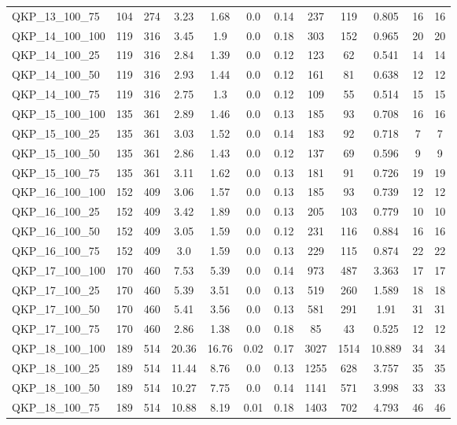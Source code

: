 \begin{table}[!h]
{\begin{tabular}{lccccccccccc}
QKP\_13\_100\_75 & 104 & 274 & 3.23 & 1.68 & 0.0 & 0.14 & 237 & 119 & 0.805 & 16 & 16\\
QKP\_14\_100\_100 & 119 & 316 & 3.45 & 1.9 & 0.0 & 0.18 & 303 & 152 & 0.965 & 20 & 20\\
QKP\_14\_100\_25 & 119 & 316 & 2.84 & 1.39 & 0.0 & 0.12 & 123 & 62 & 0.541 & 14 & 14\\
QKP\_14\_100\_50 & 119 & 316 & 2.93 & 1.44 & 0.0 & 0.12 & 161 & 81 & 0.638 & 12 & 12\\
QKP\_14\_100\_75 & 119 & 316 & 2.75 & 1.3 & 0.0 & 0.12 & 109 & 55 & 0.514 & 15 & 15\\
QKP\_15\_100\_100 & 135 & 361 & 2.89 & 1.46 & 0.0 & 0.13 & 185 & 93 & 0.708 & 16 & 16\\
QKP\_15\_100\_25 & 135 & 361 & 3.03 & 1.52 & 0.0 & 0.14 & 183 & 92 & 0.718 & 7 & 7\\
QKP\_15\_100\_50 & 135 & 361 & 2.86 & 1.43 & 0.0 & 0.12 & 137 & 69 & 0.596 & 9 & 9\\
QKP\_15\_100\_75 & 135 & 361 & 3.11 & 1.62 & 0.0 & 0.13 & 181 & 91 & 0.726 & 19 & 19\\
QKP\_16\_100\_100 & 152 & 409 & 3.06 & 1.57 & 0.0 & 0.13 & 185 & 93 & 0.739 & 12 & 12\\
QKP\_16\_100\_25 & 152 & 409 & 3.42 & 1.89 & 0.0 & 0.13 & 205 & 103 & 0.779 & 10 & 10\\
QKP\_16\_100\_50 & 152 & 409 & 3.05 & 1.59 & 0.0 & 0.12 & 231 & 116 & 0.884 & 16 & 16\\
QKP\_16\_100\_75 & 152 & 409 & 3.0 & 1.59 & 0.0 & 0.13 & 229 & 115 & 0.874 & 22 & 22\\
QKP\_17\_100\_100 & 170 & 460 & 7.53 & 5.39 & 0.0 & 0.14 & 973 & 487 & 3.363 & 17 & 17\\
QKP\_17\_100\_25 & 170 & 460 & 5.39 & 3.51 & 0.0 & 0.13 & 519 & 260 & 1.589 & 18 & 18\\
QKP\_17\_100\_50 & 170 & 460 & 5.41 & 3.56 & 0.0 & 0.13 & 581 & 291 & 1.91 & 31 & 31\\
QKP\_17\_100\_75 & 170 & 460 & 2.86 & 1.38 & 0.0 & 0.18 & 85 & 43 & 0.525 & 12 & 12\\
QKP\_18\_100\_100 & 189 & 514 & 20.36 & 16.76 & 0.02 & 0.17 & 3027 & 1514 & 10.889 & 34 & 34\\
QKP\_18\_100\_25 & 189 & 514 & 11.44 & 8.76 & 0.0 & 0.13 & 1255 & 628 & 3.757 & 35 & 35\\
QKP\_18\_100\_50 & 189 & 514 & 10.27 & 7.75 & 0.0 & 0.14 & 1141 & 571 & 3.998 & 33 & 33\\
QKP\_18\_100\_75 & 189 & 514 & 10.88 & 8.19 & 0.01 & 0.18 & 1403 & 702 & 4.793 & 46 & 46\\

\end{tabular}}
\end{table}
